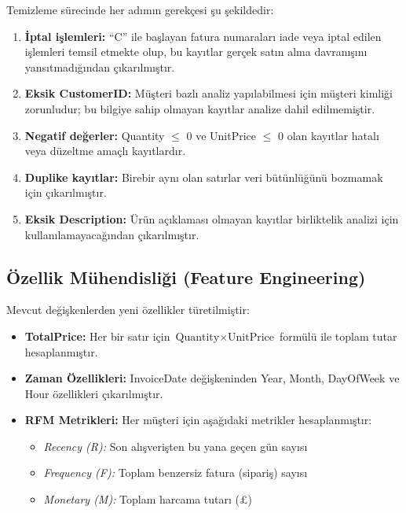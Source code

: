 \documentclass[conference]{IEEEtran}
\begin{document}
Temizleme sürecinde her adımın gerekçesi şu şekildedir:

\begin{enumerate}[leftmargin=*]
    \item \textbf{İptal işlemleri:} ``C'' ile başlayan fatura numaraları iade veya iptal edilen işlemleri temsil etmekte olup, bu kayıtlar gerçek satın alma davranışını yansıtmadığından çıkarılmıştır.
    \item \textbf{Eksik CustomerID:} Müşteri bazlı analiz yapılabilmesi için müşteri kimliği zorunludur; bu bilgiye sahip olmayan kayıtlar analize dahil edilmemiştir.
    \item \textbf{Negatif değerler:} Quantity $\leq$ 0 ve UnitPrice $\leq$ 0 olan kayıtlar hatalı veya düzeltme amaçlı kayıtlardır.
    \item \textbf{Duplike kayıtlar:} Birebir aynı olan satırlar veri bütünlüğünü bozmamak için çıkarılmıştır.
    \item \textbf{Eksik Description:} Ürün açıklaması olmayan kayıtlar birliktelik analizi için kullanılamayacağından çıkarılmıştır.
\end{enumerate}

\subsection{Özellik Mühendisliği (Feature Engineering)}

Mevcut değişkenlerden yeni özellikler türetilmiştir:

\begin{itemize}[leftmargin=*]
    \item \textbf{TotalPrice:} Her bir satır için $\text{Quantity} \times \text{UnitPrice}$ formülü ile toplam tutar hesaplanmıştır.
    \item \textbf{Zaman Özellikleri:} InvoiceDate değişkeninden Year, Month, DayOfWeek ve Hour özellikleri çıkarılmıştır.
    \item \textbf{RFM Metrikleri:} Her müşteri için aşağıdaki metrikler hesaplanmıştır:
    \begin{itemize}
        \item \textit{Recency (R):} Son alışverişten bu yana geçen gün sayısı
        \item \textit{Frequency (F):} Toplam benzersiz fatura (sipariş) sayısı
        \item \textit{Monetary (M):} Toplam harcama tutarı (£)
    \end{itemize}
\end{itemize}
\end{document}
